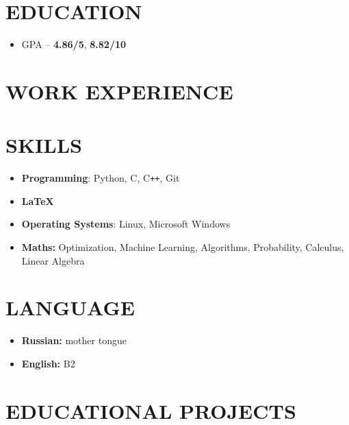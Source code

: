\documentclass[12pt]{moderncv}
\begin{document}
    \makecvtitle

    \section{EDUCATION}

        \begin{itemize}
            \item GPA -- \textbf{4.86/5}, \textbf{8.82/10}
        \end{itemize}

    \section{WORK EXPERIENCE}


    \section{SKILLS}
    
        \begin{itemize}
            \item \textbf{Programming}: Python, C, C\texttt{++}, Git
            \item \textbf{\LaTeX}
            \item \textbf{Operating Systems}: Linux, Microsoft Windows
            \item \textbf{Maths:} Optimization, Machine Learning, Algorithms, Probability, Calculus, Linear Algebra
        \end{itemize}

    \section{LANGUAGE}

        \begin{itemize}
            \item \textbf{Russian:} mother tongue
            \item \textbf{English:} B2
        \end{itemize}

    \section{EDUCATIONAL PROJECTS}
\end{document}
